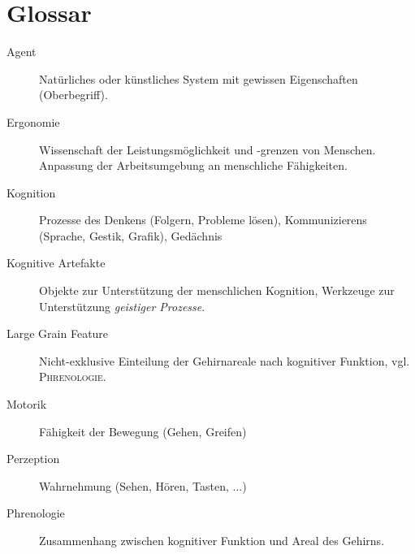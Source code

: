 \section{Glossar}

\begin{description}

\item[Agent] Natürliches oder künstliches System mit gewissen Eigenschaften (Oberbegriff).

\item[Ergonomie] Wissenschaft der Leistungsmöglichkeit und -grenzen von Menschen. Anpassung
    der Arbeitsumgebung an menschliche Fähigkeiten.

\item[Kognition] Prozesse des Denkens (Folgern, Probleme lösen),
    Kommunizierens (Sprache, Gestik, Grafik), Gedächnis

\item[Kognitive Artefakte] Objekte zur Unterstützung der menschlichen Kognition,
    Werkzeuge zur Unterstützung \emph{geistiger Prozesse}.

\item[Large Grain Feature] Nicht-exklusive Einteilung der Gehirnareale nach kognitiver
    Funktion, vgl. \textsc{Phrenologie}.

\item[Motorik] Fähigkeit der Bewegung (Gehen, Greifen)

\item[Perzeption] Wahrnehmung (Sehen, Hören, Tasten, ...)

\item[Phrenologie] Zusammenhang zwischen kognitiver Funktion und Areal des Gehirns.

\end{description}
